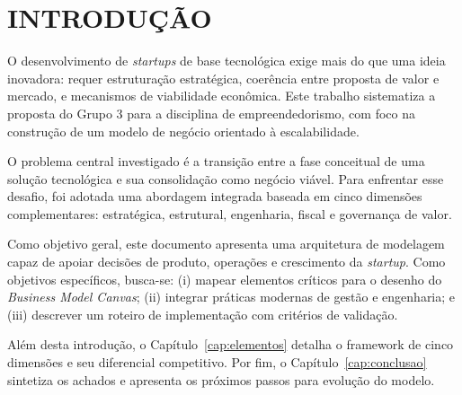 \chapter{INTRODUÇÃO}

O desenvolvimento de \textit{startups} de base tecnológica exige mais do que uma ideia inovadora: requer estruturação estratégica, coerência entre proposta de valor e mercado, e mecanismos de viabilidade econômica. Este trabalho sistematiza a proposta do Grupo 3 para a disciplina de empreendedorismo, com foco na construção de um modelo de negócio orientado à escalabilidade.

O problema central investigado é a transição entre a fase conceitual de uma solução tecnológica e sua consolidação como negócio viável. Para enfrentar esse desafio, foi adotada uma abordagem integrada baseada em cinco dimensões complementares: estratégica, estrutural, engenharia, fiscal e governança de valor.

Como objetivo geral, este documento apresenta uma arquitetura de modelagem capaz de apoiar decisões de produto, operações e crescimento da \textit{startup}. Como objetivos específicos, busca-se: (i) mapear elementos críticos para o desenho do \textit{Business Model Canvas}; (ii) integrar práticas modernas de gestão e engenharia; e (iii) descrever um roteiro de implementação com critérios de validação.

Além desta introdução, o Capítulo~\ref{cap:elementos} detalha o framework de cinco dimensões e seu diferencial competitivo. Por fim, o Capítulo~\ref{cap:conclusao} sintetiza os achados e apresenta os próximos passos para evolução do modelo.